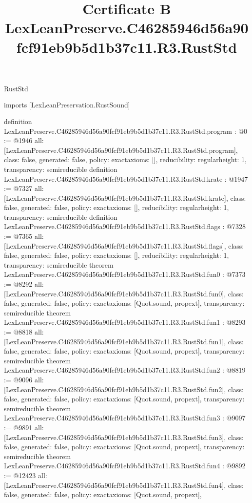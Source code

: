 \begin{lexlean}{RustStd}
\title{Certificate B LexLeanPreserve.C46285946d56a90fcf91eb9b5d1b37c11.R3.RustStd}
\begin{coremodule}
imports [LexLeanPreservation.RustSound]

definition LexLeanPreserve.C46285946d56a90fcf91eb9b5d1b37c11.R3.RustStd.program : @0 := @1946 {
  all: [LexLeanPreserve.C46285946d56a90fcf91eb9b5d1b37c11.R3.RustStd.program],
  class: false,
  generated: false,
  policy: exact{axioms: []},
  reducibility: regular{height: 1},
  transparency: semireducible
}
definition LexLeanPreserve.C46285946d56a90fcf91eb9b5d1b37c11.R3.RustStd.krate : @1947 := @7327 {
  all: [LexLeanPreserve.C46285946d56a90fcf91eb9b5d1b37c11.R3.RustStd.krate],
  class: false,
  generated: false,
  policy: exact{axioms: []},
  reducibility: regular{height: 1},
  transparency: semireducible
}
definition LexLeanPreserve.C46285946d56a90fcf91eb9b5d1b37c11.R3.RustStd.flags : @7328 := @7365 {
  all: [LexLeanPreserve.C46285946d56a90fcf91eb9b5d1b37c11.R3.RustStd.flags],
  class: false,
  generated: false,
  policy: exact{axioms: []},
  reducibility: regular{height: 1},
  transparency: semireducible
}
theorem LexLeanPreserve.C46285946d56a90fcf91eb9b5d1b37c11.R3.RustStd.fun0 : @7373 := @8292 {
  all: [LexLeanPreserve.C46285946d56a90fcf91eb9b5d1b37c11.R3.RustStd.fun0],
  class: false,
  generated: false,
  policy: exact{axioms: [Quot.sound, propext]},
  transparency: semireducible
}
theorem LexLeanPreserve.C46285946d56a90fcf91eb9b5d1b37c11.R3.RustStd.fun1 : @8293 := @8818 {
  all: [LexLeanPreserve.C46285946d56a90fcf91eb9b5d1b37c11.R3.RustStd.fun1],
  class: false,
  generated: false,
  policy: exact{axioms: [Quot.sound, propext]},
  transparency: semireducible
}
theorem LexLeanPreserve.C46285946d56a90fcf91eb9b5d1b37c11.R3.RustStd.fun2 : @8819 := @9096 {
  all: [LexLeanPreserve.C46285946d56a90fcf91eb9b5d1b37c11.R3.RustStd.fun2],
  class: false,
  generated: false,
  policy: exact{axioms: [Quot.sound, propext]},
  transparency: semireducible
}
theorem LexLeanPreserve.C46285946d56a90fcf91eb9b5d1b37c11.R3.RustStd.fun3 : @9097 := @9891 {
  all: [LexLeanPreserve.C46285946d56a90fcf91eb9b5d1b37c11.R3.RustStd.fun3],
  class: false,
  generated: false,
  policy: exact{axioms: [Quot.sound, propext]},
  transparency: semireducible
}
theorem LexLeanPreserve.C46285946d56a90fcf91eb9b5d1b37c11.R3.RustStd.fun4 : @9892 := @12423 {
  all: [LexLeanPreserve.C46285946d56a90fcf91eb9b5d1b37c11.R3.RustStd.fun4],
  class: false,
  generated: false,
  policy: exact{axioms: [Quot.sound, propext]},
}
\end{coremodule}
\end{lexlean}

